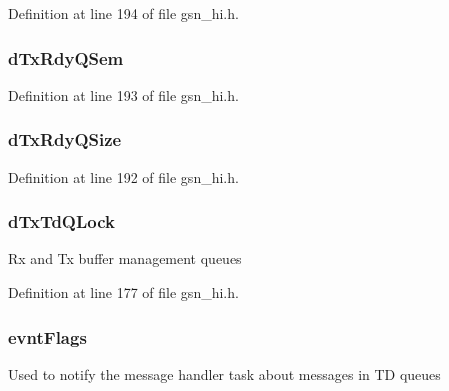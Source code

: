 Definition at line 194 of file gsn\_\-hi.h.

\hypertarget{a00085_a1519e565caee45b4b21956c8b900c256}{
\subsubsection[{dTxRdyQSem}]{ {\bf dTxRdyQSem}}}
\label{a00085_a1519e565caee45b4b21956c8b900c256}


Definition at line 193 of file gsn\_\-hi.h.

\hypertarget{a00085_a998e0b88b8a524cea841b3da7bed4eca}{
\subsubsection[{dTxRdyQSize}]{ {\bf dTxRdyQSize}}}
\label{a00085_a998e0b88b8a524cea841b3da7bed4eca}


Definition at line 192 of file gsn\_\-hi.h.

\hypertarget{a00085_a6743b8417044eb0c3d5f3d78f6081e43}{
\subsubsection[{dTxTdQLock}]{ {\bf dTxTdQLock}}}
\label{a00085_a6743b8417044eb0c3d5f3d78f6081e43}
Rx and Tx buffer management queues 

Definition at line 177 of file gsn\_\-hi.h.

\hypertarget{a00085_a9ad497e1b82185921e1803dca85cb36f}{
\subsubsection[{evntFlags}]{ {\bf evntFlags}}}
\label{a00085_a9ad497e1b82185921e1803dca85cb36f}
Used to notify the message handler task about messages in TD queues 

